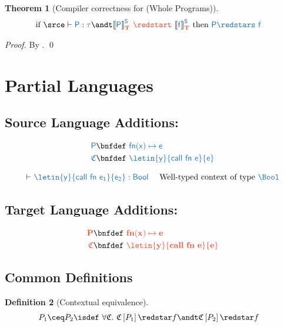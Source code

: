 \documentclass{article}
\newtheorem{theorem}{Theorem}[section]
\newtheorem{definition}[theorem]{Definition}
\theoremstyle{definition}
\begin{document}
\begin{theorem}[Compiler correctness for \compgen{\cdot} (Whole Programs)]\label{thm:comp-corr}
	\begin{align*}
		&
		\text{if }
		\srce\vdash\src{P}:\src{\tau}
		\andt
		\trg{\compgen{P}\ \redstart\ \compgen{f}}
		\text{ then }\src{P \redstars\ f}
	\end{align*}
\end{theorem}
\begin{proof}
	By .
	\qed
\end{proof}




\section{Partial Languages}
\subsection{Source Language Additions: \So}
\begin{align*}
	\src{P} \bnfdef&\
		\src{fn(x)\mapsto e}
	\\
	\src{\ctx} \bnfdef&\
		\src{
			\letin{y}{call~fn~e}{e}
		}
\end{align*}

\begin{align*}
\vdash&\ \src{\letin{y}{call~fn~e_1}{e_2} : Bool}		
	&\mbox{ Well-typed context of type }\src{\Bool}
\end{align*}

\begin{center}
\end{center}

\subsection{Target Language Additions: \To}
\begin{align*}
	\trg{P} \bnfdef&\
		\trg{fn(x)\mapsto e}
	\\
	\trg{\ctx} \bnfdef&\
		\trg{
			\letin{y}{call~fn~e}{e}
		}
\end{align*}


\subsection{Common Definitions}
\begin{definition}[Contextual equivalence]
\begin{align*}
	{P_1 \ceq P_2} \isdef&\ \forall {\ctx}.~ {\ctx\hole{P_1} \redstar f \andt \ctx\hole{P_2}\redstar f}
\end{align*}
\end{definition}
\end{document}

